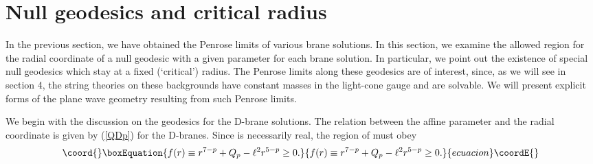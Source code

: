 \documentclass[a4paper,12pt]{article}
\begin{document}
\section{Null geodesics and critical radius}




In the previous section, we have 
obtained the Penrose limits of
various brane solutions. 
In this section, we examine the allowed region
for the radial coordinate \coordHE{} of a null geodesic 
with a given parameter \myHighlight{$\ell$}\coordHE{} for each brane solution. 
In particular, we point out the existence of 
special null geodesics which stay at a 
fixed (`critical') radius. The Penrose limits
along these geodesics are of interest, 
since, as we will see in section 4, 
the string theories on these backgrounds 
have constant masses in the light-cone gauge
and are solvable. We will present explicit forms
of the plane wave geometry resulting from such
Penrose limits.



We begin with the discussion on the geodesics
for the D\coordHE{}-brane solutions.
The relation between the affine parameter \coordHE{} 
and the radial coordinate \coordHE{}
is given by (\ref{QDp}) for the D\coordHE{}-branes. 
Since \coordHE{} is necessarily real, 
the region of \coordHE{} must obey
\begin{equation}\coord{}\boxEquation{
f(r)\equiv r^{7-p}+Q_{p}-\ell^{2}r^{5-p}\ge 0.
\label{fr}
}{
f(r)\equiv r^{7-p}+Q_{p}-\ell^{2}r^{5-p}\ge 0.
}{ecuacion}\coordE{}\end{equation}
\end{document}
